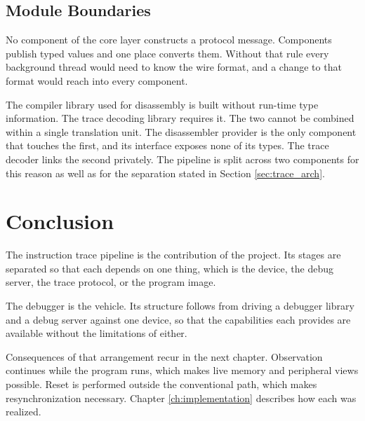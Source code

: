 \subsection{Module Boundaries}
\label{subsec:boundaries}
No component of the core layer constructs a protocol message. Components publish typed values and one place converts them. Without that rule every background thread would need to know the wire format, and a change to that format would reach into every component.

The compiler library used for disassembly is built without run-time type information. The trace decoding library requires it. The two cannot be combined within a single translation unit. The disassembler provider is the only component that touches the first, and its interface exposes none of its types. The trace decoder links the second privately. The pipeline is split across two components for this reason as well as for the separation stated in Section \ref{sec:trace_arch}.

\section{Conclusion}
The instruction trace pipeline is the contribution of the project. Its stages are separated so that each depends on one thing, which is the device, the debug server, the trace protocol, or the program image.

The debugger is the vehicle. Its structure follows from driving a debugger library and a debug server against one device, so that the capabilities each provides are available without the limitations of either.

Consequences of that arrangement recur in the next chapter. Observation continues while the program runs, which makes live memory and peripheral views possible. Reset is performed outside the conventional path, which makes resynchronization necessary. Chapter \ref{ch:implementation} describes how each was realized.
